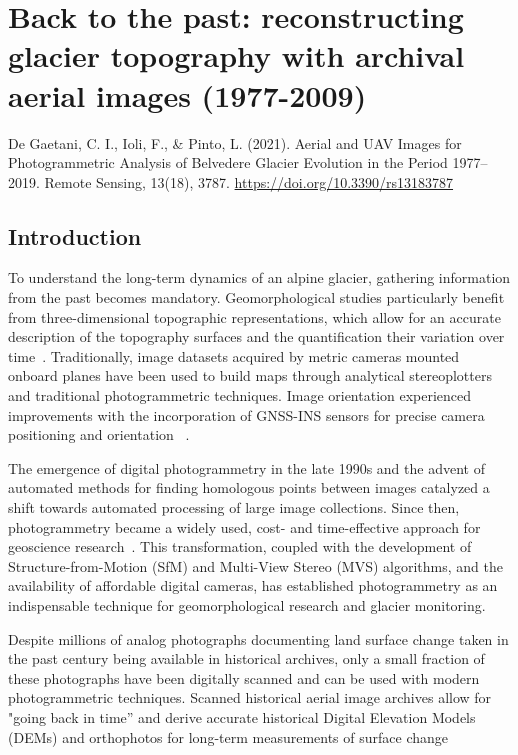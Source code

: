 \graphicspath{{figures/chapter2/}}
\onehalfspacing

\chapter{Back to the past: reconstructing glacier topography with archival aerial images
  (1977-2009)}\label{ch:2}
  
\vfill


\noindent De Gaetani, C. I., Ioli, F., \& Pinto, L. (2021). Aerial and UAV Images for
Photogrammetric Analysis of Belvedere Glacier Evolution in the Period 1977–2019. Remote
Sensing, 13(18), 3787. \url{https://doi.org/10.3390/rs13183787}

\newpage

\section{Introduction}\label{sec:2:introduction}

To understand the long-term dynamics of an alpine glacier, gathering information from the past becomes mandatory. 
Geomorphological studies particularly benefit from three-dimensional topographic representations, which allow for an accurate description of the topography surfaces and the quantification their variation over time~\citep{chandler1995steady}.
Traditionally, image datasets acquired by metric cameras mounted onboard planes have been used to build maps through analytical stereoplotters and traditional photogrammetric techniques. 
Image orientation experienced improvements with the incorporation of GNSS-INS sensors for precise camera positioning and orientation
~\citep{Forlani_pinto2001, jacobsen2004issues}.

The emergence of digital photogrammetry in the late 1990s and the advent of automated methods for finding homologous points between images catalyzed a shift towards automated processing of large image collections. 
Since then, photogrammetry became a widely used, cost- and time-effective approach for geoscience research~\citep{Lane2000}.
This transformation, coupled with the development of Structure-from-Motion (SfM) and Multi-View Stereo (MVS) algorithms, and the availability of affordable digital cameras, has established photogrammetry as an indispensable technique for geomorphological research and glacier monitoring.

Despite millions of analog photographs documenting land surface change taken in the past century being available in historical archives, only a small fraction of these photographs have been digitally scanned and can be used with modern photogrammetric techniques. 
Scanned historical aerial image archives allow for "going back in time” and derive accurate historical Digital Elevation Models (DEMs) and orthophotos for long-term measurements of surface change ~\citep{Micheletti2015}

